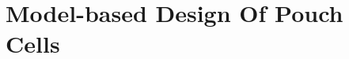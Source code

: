 
\graphicspath{{3/figures/}}

\chapter{Model-based Design Of Pouch Cells}\label{ch:modelbaseddesign}
\startcontents[chapters]

\bigskip

